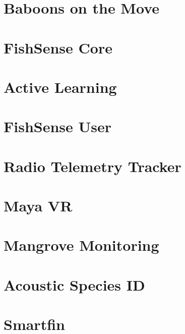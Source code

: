 \section{Baboons on the Move}

\section{FishSense Core}

\section{Active Learning}

\section{FishSense User}

\section{Radio Telemetry Tracker}

\section{Maya VR}

\section{Mangrove Monitoring}

\section{Acoustic Species ID}

\section{Smartfin}


